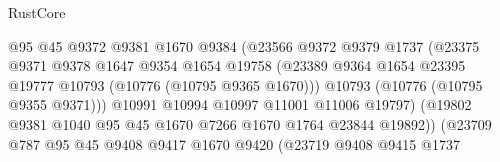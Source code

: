 \begin{lexlean}{RustCore}
\begin{coremodule}
                                      @95
                                      @45
                                      @9372
                                      @9381
                                      @1670
                                      @9384
                                      (@23566
                                        @9372
                                        @9379
                                        @1737
                                        (@23375
                                          @9371
                                          @9378
                                          @1647
                                          @9354
                                          @1654
                                          @19758
                                          (@23389
                                            @9364
                                            @1654
                                            @23395
                                            @19777
                                            @10793
                                            (@10776 (@10795 @9365 @1670)))
                                          @10793
                                          (@10776 (@10795 @9355 @9371)))
                                        @10991
                                        @10994
                                        @10997
                                        @11001
                                        @11006
                                        @19797)
                                      (@19802
                                        @9381
                                        @1040
                                        @95
                                        @45
                                        @1670
                                        @7266
                                        @1670
                                        @1764
                                        @23844
                                        @19892))
                                    (@23709
                                      @787
                                      @95
                                      @45
                                      @9408
                                      @9417
                                      @1670
                                      @9420
                                      (@23719
                                        @9408
                                        @9415
                                        @1737

\end{coremodule}
\end{lexlean}
